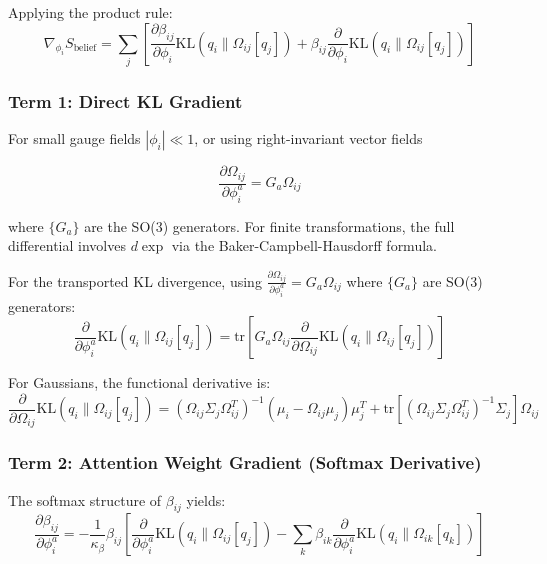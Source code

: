 \documentclass[11pt]{article}
\begin{document}
Applying the product rule:
\begin{equation}
\nabla_{\phi_i} S_{\mathrm{belief}} = \sum_j \left[ \frac{\partial \beta_{ij}}{\partial \phi_i} \mathrm{KL}(q_i \| \Omega_{ij}[q_j]) + \beta_{ij} \frac{\partial}{\partial \phi_i}\mathrm{KL}(q_i \| \Omega_{ij}[q_j]) \right]
\end{equation}

\subsubsection*{Term 1: Direct KL Gradient}

For small gauge fields $|\phi_i| \ll 1$, or using right-invariant 
vector fields

\begin{equation}
\frac{\partial \Omega_{ij}}{\partial \phi_i^a} = G_a \Omega_{ij}
\end{equation}

where $\{G_a\}$ are the SO(3) generators. For finite transformations, 
the full differential involves $d\exp$ via the Baker-Campbell-Hausdorff 
formula.

For the transported KL divergence, using $\frac{\partial \Omega_{ij}}{\partial \phi_i^a} = G_a \Omega_{ij}$ where $\{G_a\}$ are SO(3) generators:
\begin{equation}
\frac{\partial}{\partial \phi_i^a}\mathrm{KL}(q_i \| \Omega_{ij}[q_j]) = \mathrm{tr}\left[G_a \Omega_{ij} \frac{\partial}{\partial \Omega_{ij}}\mathrm{KL}(q_i \| \Omega_{ij}[q_j])\right]
\end{equation}

For Gaussians, the functional derivative is:
\begin{equation}
\frac{\partial}{\partial \Omega_{ij}}\mathrm{KL}(q_i \| \Omega_{ij}[q_j]) = (\Omega_{ij}\Sigma_j\Omega_{ij}^T)^{-1}(\mu_i - \Omega_{ij}\mu_j)\mu_j^T + \mathrm{tr}\left[(\Omega_{ij}\Sigma_j\Omega_{ij}^T)^{-1}\Sigma_j\right]\Omega_{ij}
\end{equation}

\subsubsection*{Term 2: Attention Weight Gradient (Softmax Derivative)}

The softmax structure of $\beta_{ij}$ yields:
\begin{equation}
\frac{\partial \beta_{ij}}{\partial \phi_i^a} = -\frac{1}{\kappa_\beta} \beta_{ij} \left[\frac{\partial}{\partial \phi_i^a}\mathrm{KL}(q_i \| \Omega_{ij}[q_j]) - \sum_k \beta_{ik} \frac{\partial}{\partial \phi_i^a}\mathrm{KL}(q_i \| \Omega_{ik}[q_k])\right]
\end{equation}
\end{document}
